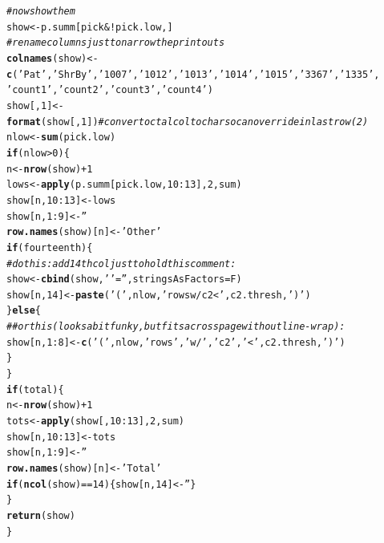 \documentclass{article}\usepackage[]{graphicx}\usepackage[]{color}
\makeatletter
\newcommand{\hlnum}[1]{\textcolor[rgb]{0.686,0.059,0.569}{#1}}%
\newcommand{\hlstr}[1]{\textcolor[rgb]{0.192,0.494,0.8}{#1}}%
\newcommand{\hlcom}[1]{\textcolor[rgb]{0.678,0.584,0.686}{\textit{#1}}}%
\newcommand{\hlopt}[1]{\textcolor[rgb]{0,0,0}{#1}}%
\newcommand{\hlstd}[1]{\textcolor[rgb]{0.345,0.345,0.345}{#1}}%
\newcommand{\hlkwa}[1]{\textcolor[rgb]{0.161,0.373,0.58}{\textbf{#1}}}%
\newcommand{\hlkwb}[1]{\textcolor[rgb]{0.69,0.353,0.396}{#1}}%
\newcommand{\hlkwc}[1]{\textcolor[rgb]{0.333,0.667,0.333}{#1}}%
\newcommand{\hlkwd}[1]{\textcolor[rgb]{0.737,0.353,0.396}{\textbf{#1}}}%
\newenvironment{kframe}{%
 \def\at@end@of@kframe{}%
 \ifinner\ifhmode%
  \def\at@end@of@kframe{\end{minipage}}%
  \begin{minipage}{\columnwidth}%
 \fi\fi%
 \def\FrameCommand##1{\hskip\@totalleftmargin \hskip-\fboxsep
 \colorbox{shadecolor}{##1}\hskip-\fboxsep
     \hskip-\linewidth \hskip-\@totalleftmargin \hskip\columnwidth}%
 \MakeFramed {\advance\hsize-\width
   \@totalleftmargin\z@ \linewidth\hsize
   \@setminipage}}%
 {\par\unskip\endMakeFramed%
 \at@end@of@kframe}
\newenvironment{knitrout}{}{} %
\makeatother
\begin{document}
\begin{knitrout}
\begin{kframe}
\begin{alltt}
  \hlcom{# now show them}
  \hlstd{show} \hlkwb{<-} \hlstd{p.summ[pick} \hlopt{& !} \hlstd{pick.low,]}
  \hlcom{# rename columns just to narrow the printouts}
  \hlkwd{colnames}\hlstd{(show)} \hlkwb{<-} \hlkwd{c}\hlstd{(}\hlstr{'Pat'}\hlstd{,}\hlstr{'ShrBy'}\hlstd{,}\hlstr{'1007'}\hlstd{,} \hlstr{'1012'}\hlstd{,} \hlstr{'1013'}\hlstd{,} \hlstr{'1014'}\hlstd{,} \hlstr{'1015'}\hlstd{,} \hlstr{'3367'}\hlstd{,} \hlstr{'1335'}\hlstd{,}
                      \hlstr{'count1'}\hlstd{,} \hlstr{'count2'}\hlstd{,} \hlstr{'count3'}\hlstd{,}\hlstr{'count4'}\hlstd{)}
  \hlstd{show[,}\hlnum{1}\hlstd{]} \hlkwb{<-} \hlkwd{format}\hlstd{(show[,}\hlnum{1}\hlstd{])}  \hlcom{# convert octal col to char so can override in last row(2)}
  \hlstd{nlow} \hlkwb{<-} \hlkwd{sum}\hlstd{(pick.low)}
  \hlkwa{if}\hlstd{(nlow} \hlopt{>} \hlnum{0}\hlstd{)\{}
    \hlstd{n} \hlkwb{<-} \hlkwd{nrow}\hlstd{(show)}\hlopt{+}\hlnum{1}
    \hlstd{lows} \hlkwb{<-} \hlkwd{apply}\hlstd{(p.summ[pick.low,}\hlnum{10}\hlopt{:}\hlnum{13}\hlstd{],}\hlnum{2}\hlstd{,sum)}
    \hlstd{show[n,}\hlnum{10}\hlopt{:}\hlnum{13}\hlstd{]} \hlkwb{<-} \hlstd{lows}
    \hlstd{show[n,}\hlnum{1}\hlopt{:}\hlnum{9}\hlstd{]} \hlkwb{<-} \hlstr{''}
    \hlkwd{row.names}\hlstd{(show)[n]} \hlkwb{<-} \hlstr{'Other'}
    \hlkwa{if}\hlstd{(fourteenth)\{}
      \hlcom{# do this: add 14th col just to hold this comment:}
      \hlstd{show} \hlkwb{<-} \hlkwd{cbind}\hlstd{(show,}\hlstr{' '}\hlstd{=}\hlstr{''}\hlstd{,} \hlkwc{stringsAsFactors}\hlstd{=F)}
      \hlstd{show[n,}\hlnum{14}\hlstd{]} \hlkwb{<-} \hlkwd{paste}\hlstd{(}\hlstr{'('}\hlstd{, nlow,} \hlstr{'rows w/ c2 <'}\hlstd{, c2.thresh,} \hlstr{')'}\hlstd{)}
    \hlstd{\}} \hlkwa{else} \hlstd{\{}
      \hlcom{## or this (looks a bit funky, but fits across page without line-wrap): }
      \hlstd{show[n,}\hlnum{1}\hlopt{:}\hlnum{8}\hlstd{]} \hlkwb{<-}\hlkwd{c}\hlstd{(}\hlstr{'('}\hlstd{, nlow,} \hlstr{'rows'}\hlstd{,} \hlstr{'w/'}\hlstd{,} \hlstr{'c2'}\hlstd{,} \hlstr{'<'}\hlstd{, c2.thresh,} \hlstr{')'}\hlstd{)}
    \hlstd{\}}
  \hlstd{\}}
  \hlkwa{if}\hlstd{(total)\{}
    \hlstd{n} \hlkwb{<-} \hlkwd{nrow}\hlstd{(show)}\hlopt{+}\hlnum{1}
    \hlstd{tots} \hlkwb{<-} \hlkwd{apply}\hlstd{(show[,}\hlnum{10}\hlopt{:}\hlnum{13}\hlstd{],}\hlnum{2}\hlstd{,sum)}
    \hlstd{show[n,}\hlnum{10}\hlopt{:}\hlnum{13}\hlstd{]} \hlkwb{<-} \hlstd{tots}
    \hlstd{show[n,}\hlnum{1}\hlopt{:}\hlnum{9}\hlstd{]} \hlkwb{<-} \hlstr{''}
    \hlkwd{row.names}\hlstd{(show)[n]} \hlkwb{<-} \hlstr{'Total'}
    \hlkwa{if}\hlstd{(}\hlkwd{ncol}\hlstd{(show)}\hlopt{==}\hlnum{14}\hlstd{)\{show[n,}\hlnum{14}\hlstd{]}\hlkwb{<-}\hlstr{''}\hlstd{\}}
  \hlstd{\}}
  \hlkwd{return}\hlstd{(show)}
\hlstd{\}}
\end{alltt}
\end{kframe}
\end{knitrout}
\end{document}
